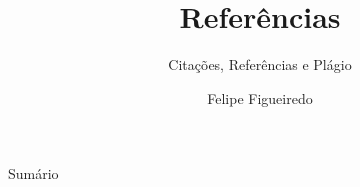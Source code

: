 \documentclass{beamer}
\title%
{Referências}
\subtitle
{Citações, Referências e Plágio} %
\author%
{Felipe Figueiredo}%
\institute[INTO] %
{Instituto Nacional de Traumatologia e Ortopedia
}
\date%
{}
\begin{document}
\begin{frame}
  \titlepage
\end{frame}

\begin{frame}{Sumário}
  \tableofcontents
\end{frame}








\end{document}
